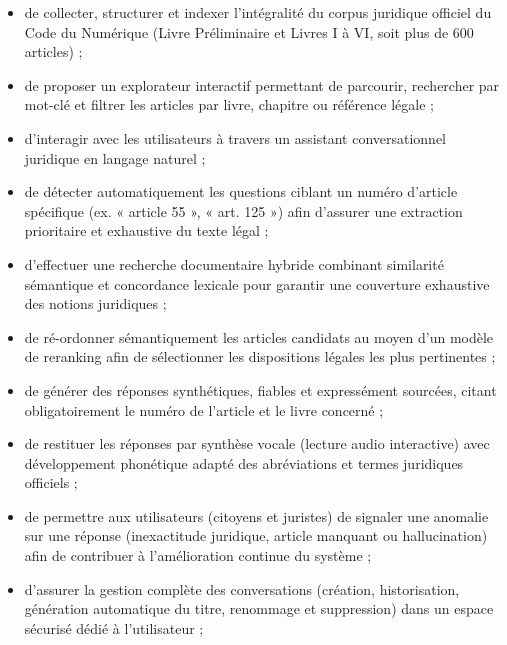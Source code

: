 \begin{itemize}
    \item de collecter, structurer et indexer l'intégralité du corpus juridique officiel du Code du Numérique (Livre Préliminaire et Livres I à VI, soit plus de 600 articles) ;
    
    \item de proposer un explorateur interactif permettant de parcourir, rechercher par mot-clé et filtrer les articles par livre, chapitre ou référence légale ;
    
    \item d'interagir avec les utilisateurs à travers un assistant conversationnel juridique en langage naturel ;
    
    \item de détecter automatiquement les questions ciblant un numéro d'article spécifique (ex. « article 55 », « art. 125 ») afin d'assurer une extraction prioritaire et exhaustive du texte légal ;
    
    \item d'effectuer une recherche documentaire hybride combinant similarité sémantique et concordance lexicale pour garantir une couverture exhaustive des notions juridiques ;
    
    \item de ré-ordonner sémantiquement les articles candidats au moyen d'un modèle de reranking afin de sélectionner les dispositions légales les plus pertinentes ;
    
    \item de générer des réponses synthétiques, fiables et expressément sourcées, citant obligatoirement le numéro de l'article et le livre concerné ;
    
    \item de restituer les réponses par synthèse vocale (lecture audio interactive) avec développement phonétique adapté des abréviations et termes juridiques officiels ;
    
    \item de permettre aux utilisateurs (citoyens et juristes) de signaler une anomalie sur une réponse (inexactitude juridique, article manquant ou hallucination) afin de contribuer à l'amélioration continue du système ;
    
    \item d'assurer la gestion complète des conversations (création, historisation, génération automatique du titre, renommage et suppression) dans un espace sécurisé dédié à l'utilisateur ;
    

\end{itemize}
